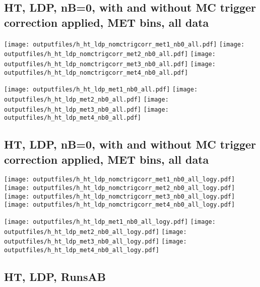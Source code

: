 \documentclass[11pt]{article}
\begin{document}
   \clearpage
     \subsection{ HT, LDP, nB=0, with and without MC trigger correction applied, MET bins, all data}

    \noindent
     \texttt{[image: outputfiles/h\_ht\_ldp\_nomctrigcorr\_met1\_nb0\_all.pdf]}
     \texttt{[image: outputfiles/h\_ht\_ldp\_nomctrigcorr\_met2\_nb0\_all.pdf]}
     \texttt{[image: outputfiles/h\_ht\_ldp\_nomctrigcorr\_met3\_nb0\_all.pdf]}
     \texttt{[image: outputfiles/h\_ht\_ldp\_nomctrigcorr\_met4\_nb0\_all.pdf]}

    \noindent
     \texttt{[image: outputfiles/h\_ht\_ldp\_met1\_nb0\_all.pdf]}
     \texttt{[image: outputfiles/h\_ht\_ldp\_met2\_nb0\_all.pdf]}
     \texttt{[image: outputfiles/h\_ht\_ldp\_met3\_nb0\_all.pdf]}
     \texttt{[image: outputfiles/h\_ht\_ldp\_met4\_nb0\_all.pdf]}

   \clearpage
     \subsection{ HT, LDP, nB=0, with and without MC trigger correction applied, MET bins, all data}

    \noindent
     \texttt{[image: outputfiles/h\_ht\_ldp\_nomctrigcorr\_met1\_nb0\_all\_logy.pdf]}
     \texttt{[image: outputfiles/h\_ht\_ldp\_nomctrigcorr\_met2\_nb0\_all\_logy.pdf]}
     \texttt{[image: outputfiles/h\_ht\_ldp\_nomctrigcorr\_met3\_nb0\_all\_logy.pdf]}
     \texttt{[image: outputfiles/h\_ht\_ldp\_nomctrigcorr\_met4\_nb0\_all\_logy.pdf]}

    \noindent
     \texttt{[image: outputfiles/h\_ht\_ldp\_met1\_nb0\_all\_logy.pdf]}
     \texttt{[image: outputfiles/h\_ht\_ldp\_met2\_nb0\_all\_logy.pdf]}
     \texttt{[image: outputfiles/h\_ht\_ldp\_met3\_nb0\_all\_logy.pdf]}
     \texttt{[image: outputfiles/h\_ht\_ldp\_met4\_nb0\_all\_logy.pdf]}

   \clearpage
    \subsection{ HT, LDP, RunsAB}
\end{document}
